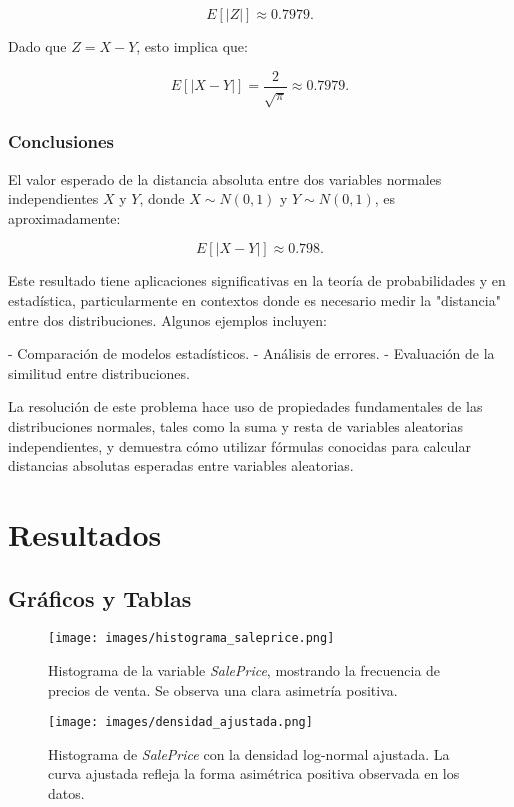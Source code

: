 \documentclass[12pt]{article}
\begin{document}
\[
E[|Z|] \approx 0.7979.
\]

Dado que $Z = X - Y$, esto implica que:

\[
E[|X - Y|] = \frac{2}{\sqrt{\pi}} \approx 0.7979.
\]

\subsubsection{Conclusiones}
El valor esperado de la distancia absoluta entre dos variables normales independientes $X$ y $Y$, donde $X \sim N(0, 1)$ y $Y \sim N(0, 1)$, es aproximadamente:

\[
E[|X - Y|] \approx 0.798.
\]

Este resultado tiene aplicaciones significativas en la teoría de probabilidades y en estadística, particularmente en contextos donde es necesario medir la "distancia" entre dos distribuciones. Algunos ejemplos incluyen:

- Comparación de modelos estadísticos.
- Análisis de errores.
- Evaluación de la similitud entre distribuciones.

La resolución de este problema hace uso de propiedades fundamentales de las distribuciones normales, tales como la suma y resta de variables aleatorias independientes, y demuestra cómo utilizar fórmulas conocidas para calcular distancias absolutas esperadas entre variables aleatorias.



\newpage

\section{Resultados}
\subsection{Gráficos y Tablas}



\begin{figure}[H]
    \centering
    \texttt{[image: images/histograma\_saleprice.png]}
    \caption{Histograma de la variable \textit{SalePrice}, mostrando la frecuencia de precios de venta. Se observa una clara asimetría positiva.}
    \label{fig:histograma}
\end{figure}

\begin{figure}[H]
    \centering
    \texttt{[image: images/densidad\_ajustada.png]}
    \caption{Histograma de \textit{SalePrice} con la densidad log-normal ajustada. La curva ajustada refleja la forma asimétrica positiva observada en los datos.}
    \label{fig:densidad_ajustada}
\end{figure}
\end{document}

